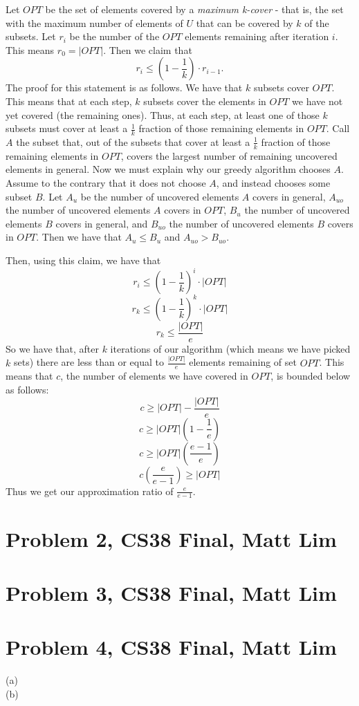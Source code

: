 \documentclass{article}
\begin{document}
Let $OPT$ be the set of elements covered by a \textit{maximum k-cover} - that is, the set
with the maximum number of elements of $U$ that can be covered by $k$ of the
subsets. Let $r_i$ be the number of the $OPT$ elements remaining after
iteration $i$. This means $r_0 = |OPT|$. Then we claim that
\[ r_i \leq (1 - \frac{1}{k}) \cdot r_{i-1}. \]
The proof for this statement is as follows. We have
that $k$ subsets cover $OPT$. This means that at each step, $k$ subsets
cover the elements in $OPT$ we have not yet covered (the remaining ones).
Thus, at each step, at least one of those $k$ subsets must cover at least a $\frac{1}{k}$
fraction of those remaining elements in $OPT$. Call $A$ the subset that, out of the
subsets that cover at least a $\frac{1}{k}$ fraction of those remaining
elements in $OPT$, covers the largest number of remaining uncovered elements in general.
Now we must explain why our greedy algorithm chooses $A$. Assume to the contrary
that it does not choose $A$, and instead chooses some subset $B$. Let $A_u$ be the
number of uncovered elements $A$ covers in general, $A_{uo}$ the number of
uncovered elements $A$ covers in $OPT$, $B_u$ the number of uncovered
elements $B$ covers in general, and $B_{uo}$ the number of uncovered elements
$B$ covers in $OPT$. Then we have that $A_u \leq B_u$ and $A_{uo} > B_{uo}$.

Then, using this claim, we have that
\[ r_i \leq (1 - \frac{1}{k})^i \cdot |OPT| \]
\[ r_k \leq (1 - \frac{1}{k})^k \cdot |OPT| \]
\[ r_k \leq \frac{|OPT|}{e} \]
So we have that, after $k$ iterations of our algorithm (which means we have
picked $k$ sets) there are less than or equal to $\frac{|OPT|}{e}$ elements
remaining of set $OPT$. This means that $c$, the number of elements we have
covered in $OPT$, is bounded below as follows:
\[ c \geq |OPT| - \frac{|OPT|}{e} \]
\[ c \geq |OPT|(1 - \frac{1}{e}) \]
\[ c \geq |OPT|(\frac{e-1}{e}) \]
\[ c(\frac{e}{e-1}) \geq |OPT| \]
Thus we get our approximation ratio of $\frac{e}{e-1}$.
\newpage

\section*{Problem 2, CS38 Final, Matt Lim}
\newpage

\section*{Problem 3, CS38 Final, Matt Lim}
\newpage

\section*{Problem 4, CS38 Final, Matt Lim}
\begin{description}
    \item[(a)]
    \item[(b)]
\end{description}
\newpage

\end{document}
